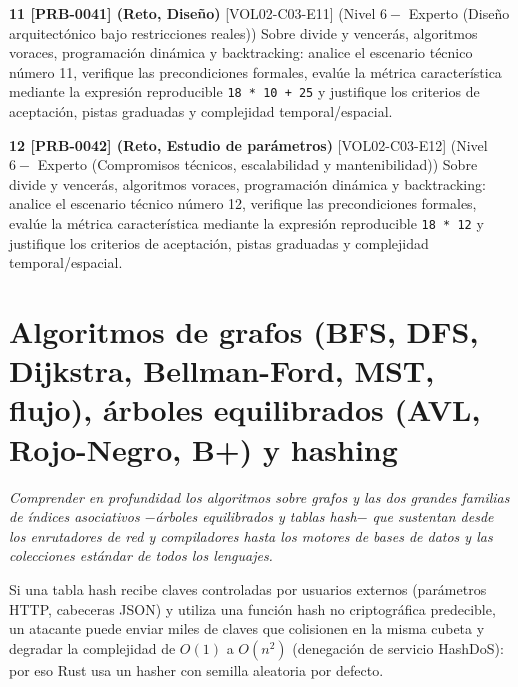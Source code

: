 \documentclass{book}
\begin{document}
\begin{tcolorbox}[title={Ejercicios}, studiumworked, breakable]
\noindent\textbf{11 [PRB-0041] (Reto, Diseño)}
[VOL02-C03-E11] (Nivel \(6 -\) Experto (Diseño arquitectónico bajo restricciones reales)) Sobre divide y vencerás, algoritmos voraces, programación dinámica y backtracking: analice el escenario técnico número 11, verifique las precondiciones formales, evalúe la métrica característica mediante la expresión reproducible \texttt{18 * 10 + 25} y justifique los criterios de aceptación, pistas graduadas y complejidad temporal/espacial.

\noindent\textbf{12 [PRB-0042] (Reto, Estudio de parámetros)}
[VOL02-C03-E12] (Nivel \(6 -\) Experto (Compromisos técnicos, escalabilidad y mantenibilidad)) Sobre divide y vencerás, algoritmos voraces, programación dinámica y backtracking: analice el escenario técnico número 12, verifique las precondiciones formales, evalúe la métrica característica mediante la expresión reproducible \texttt{18 * 12} y justifique los criterios de aceptación, pistas graduadas y complejidad temporal/espacial.
\end{tcolorbox}

\chapter{Algoritmos de grafos (BFS, DFS, Dijkstra, Bellman-Ford, MST, flujo), árboles equilibrados (AVL, Rojo-Negro, B+) y hashing}
\label{chap:cap04-grafos-arboles-equilibrados-hashing}

\noindent\textit{Comprender en profundidad los algoritmos sobre grafos y las dos grandes familias de índices asociativos \(-\)árboles equilibrados y tablas hash\(-\) que sustentan desde los enrutadores de red y compiladores hasta los motores de bases de datos y las colecciones estándar de todos los lenguajes.}

\begin{tcolorbox}[title={Consejo}, studiumtip, breakable]

Si una tabla hash recibe claves controladas por usuarios externos (parámetros HTTP, cabeceras JSON) y utiliza una función hash no criptográfica predecible, un atacante puede enviar miles de claves que colisionen en la misma cubeta y degradar la complejidad de \(O(1)\) a \(O(n^2)\) (denegación de servicio HashDoS): por eso Rust usa un hasher con semilla aleatoria por defecto.
\end{tcolorbox}
\end{document}
